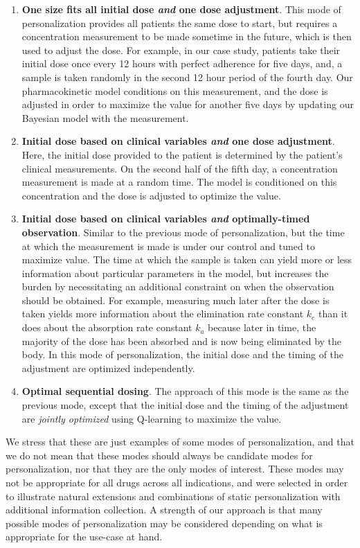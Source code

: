 \begin{enumerate}
	\item \textbf{One size fits all initial dose \textit{and} one dose adjustment}.  This mode of personalization provides all patients the same dose to start, but requires a concentration measurement to be made sometime in the future, which is then used to adjust the dose.  For example, in our case study, patients take their initial dose once every 12 hours with perfect adherence for five days, and, a sample is taken randomly in the second 12 hour period of the fourth day.  Our pharmacokinetic model conditions on this measurement, and the dose is adjusted in order to maximize the value  for another five days by updating our Bayesian model with the measurement.
	
	\item \textbf{Initial dose based on clinical variables \textit{and} one dose adjustment}.  Here, the initial dose provided to the patient is determined by the patient's clinical measurements. On the second half of the fifth day, a concentration measurement is made at a random time. The model is conditioned on this concentration and the dose is adjusted to optimize the value.
	
	\item \textbf{Initial dose based on clinical variables \textit{and} optimally-timed observation}.  Similar to the previous mode of personalization, but the time at which the measurement is made is under our control and tuned to maximize value. The time at which the sample is taken can yield more or less information about particular parameters in the model, but increases the burden by necessitating an additional constraint on when the observation should be obtained. For example, measuring much later after the dose is taken yields more information about the elimination rate constant $k_e$ than it does about the absorption rate constant $k_a$ because later in time, the majority of the dose has been absorbed and is now being eliminated by the body. In this mode of personalization, the initial dose and the timing of the adjustment are optimized independently. 
	
	\item \textbf{Optimal sequential dosing}. The approach of this mode is the same as the previous mode, except that the initial dose and the timing of the adjustment are \textit{jointly optimized} using Q-learning to maximize the value.
\end{enumerate}
We stress that these are just examples of some modes of personalization, and that we do not mean that these modes should always be candidate modes for personalization, nor that they are the only modes of interest.  These modes may not be appropriate for all drugs across all indications, and were selected in order to illustrate natural extensions and combinations of static personalization with additional information collection. A strength of our approach is that many possible modes of personalization may be considered depending on what is appropriate for the use-case at hand.

